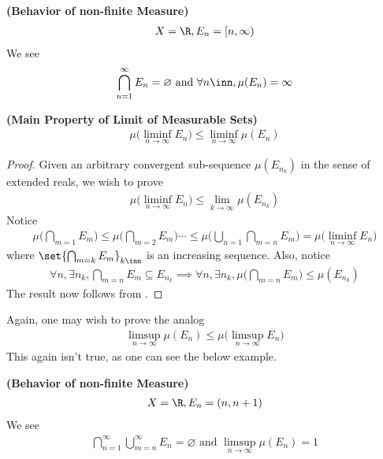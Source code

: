 \documentclass{report}
\begin{document}
\begin{Example}{\textbf{(Behavior of non-finite Measure)}}{}
\begin{align*}
X=\R, E_n=[n,\infty)
\end{align*}
We see 
\begin{align*}
\bigcap_{n=1}^\infty E_n=\varnothing\text{ and }\forall n\inn,\mu(E_n)=\infty 
\end{align*}
\end{Example}
\begin{theorem}
\label{0.7.12}
\textbf{(Main Property of Limit of Measurable Sets)} 
\begin{align*}
 \mu \Big(\liminf_{n\to\infty}  E_n\Big)\leq  \liminf_{n\to\infty}  \mu(E_n)
\end{align*}
\end{theorem}
\begin{proof}
Given an arbitrary convergent sub-sequence $\mu (E_{n_k})$ in the sense of extended reals, we wish to prove 
\begin{align*}
\mu\Big(\liminf_{n\to\infty} E_n \Big)\leq \lim_{k\to\infty} \mu(E_{n_k})
\end{align*}
Notice 
\begin{align*}
  \mu \Big(\bigcap_{m=1}E_m \Big)\leq \mu \Big(\bigcap_{m=2}E_m \Big) \cdots \leq \mu \Big(\bigcup_{n=1} \bigcap_{m=n} E_m \Big)=\mu \Big(\liminf_{n\to\infty} E_n \Big)
\end{align*}
where $\set{\bigcap_{m=k}E_m}_{k\inn}$ is an increasing sequence. Also, notice 
\begin{align*}
\forall n, \exists n_k, \bigcap_{m=n}E_m \subseteq E_{n_k} \implies \forall n, \exists n_k, \mu \Big(\bigcap_{m=n}E_m \Big)\leq \mu (E_{n_k})
\end{align*}
The result now follows from . 
\end{proof}
\begin{mdframed}
Again, one may wish to prove the analog 
\begin{align*}
\limsup_{n\to\infty} \mu (E_n)\leq \mu \Big(\limsup_{n\to\infty} E_n \Big)
\end{align*}
This again isn't true, as one can see the below example.
\end{mdframed}
\begin{Example}{\textbf{(Behavior of non-finite Measure)}}{}
\begin{align*}
X=\R, E_n=(n,n+1)
\end{align*}
We see 
\begin{align*}
\bigcap_{n=1}^\infty\bigcup_{m=n}^\infty E_n=\varnothing \text{ and }\limsup_{n\to\infty} \mu (E_n)=1
\end{align*}
\end{Example}
\end{document}
